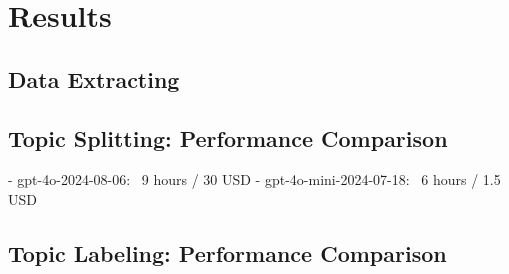 \documentclass[]{interact}
\theoremstyle{plain}%
\theoremstyle{definition}
\theoremstyle{remark}
\begin{document}


\section{Results}




\subsection{Data Extracting}




\subsection{Topic Splitting: Performance Comparison}

- gpt-4o-2024-08-06: ~9 hours / 30 USD
- gpt-4o-mini-2024-07-18: ~6 hours / 1.5 USD





\subsection{Topic Labeling: Performance Comparison}
\end{document}
